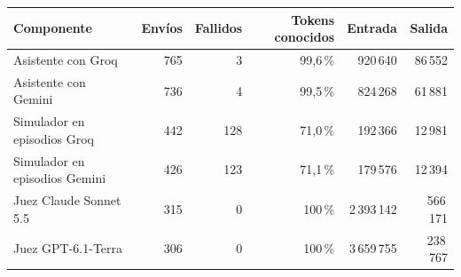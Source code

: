\begin{tabular}{lrrrrr}\toprule
Componente & Envíos & Fallidos & Tokens conocidos & Entrada & Salida \\ \midrule
Asistente con Groq & 765 & 3 & 99,6\,\% & 920\,640 & 86\,552 \\
Asistente con Gemini & 736 & 4 & 99,5\,\% & 824\,268 & 61\,881 \\
Simulador en episodios Groq & 442 & 128 & 71,0\,\% & 192\,366 & 12\,981 \\
Simulador en episodios Gemini & 426 & 123 & 71,1\,\% & 179\,576 & 12\,394 \\
\midrule
Juez Claude Sonnet 5.5 & 315 & 0 & 100\,\% & 2\,393\,142 & 566\,171 \\
Juez GPT-6.1-Terra & 306 & 0 & 100\,\% & 3\,659\,755 & 238\,767 \\
\bottomrule\end{tabular}
